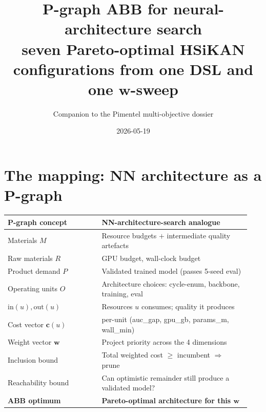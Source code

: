 \documentclass[11pt,a4paper]{article}
\title{P-graph ABB for neural-architecture search\\[3pt]
       \large\normalfont
       seven Pareto-optimal HSiKAN configurations from one DSL
       and one $\boldsymbol{w}$-sweep}
\author{Companion to the Pimentel multi-objective dossier}
\date{2026-05-19}
\begin{document}
\maketitle

\begin{center}
\end{center}

\vspace{4pt}

\section{The mapping: NN architecture as a P-graph}

\begin{center}\small
\begin{tabular}{p{0.36\linewidth} p{0.58\linewidth}}
\toprule
P-graph concept & NN-architecture-search analogue \\
\midrule
Materials $M$                & Resource budgets $+$ intermediate quality artefacts \\
Raw materials $R$            & GPU budget, wall-clock budget \\
Product demand $P$           & Validated trained model (passes 5-seed eval) \\
Operating units $O$          & Architecture choices: cycle-enum, backbone, training, eval \\
$\mathrm{in}(u), \mathrm{out}(u)$ & Resources $u$ consumes; quality it produces \\
Cost vector $\boldsymbol{c}(u)$  & per-unit \textsf{(auc\_gap, gpu\_gb, params\_m, wall\_min)} \\
Weight vector $\boldsymbol{w}$   & Project priority across the 4 dimensions \\
Inclusion bound              & Total weighted cost $\geq$ incumbent $\Rightarrow$ prune \\
Reachability bound           & Can optimistic remainder still produce a validated model? \\
\textbf{ABB optimum}         & \textbf{Pareto-optimal architecture for this $\boldsymbol{w}$} \\
\bottomrule
\end{tabular}
\end{center}
\end{document}
